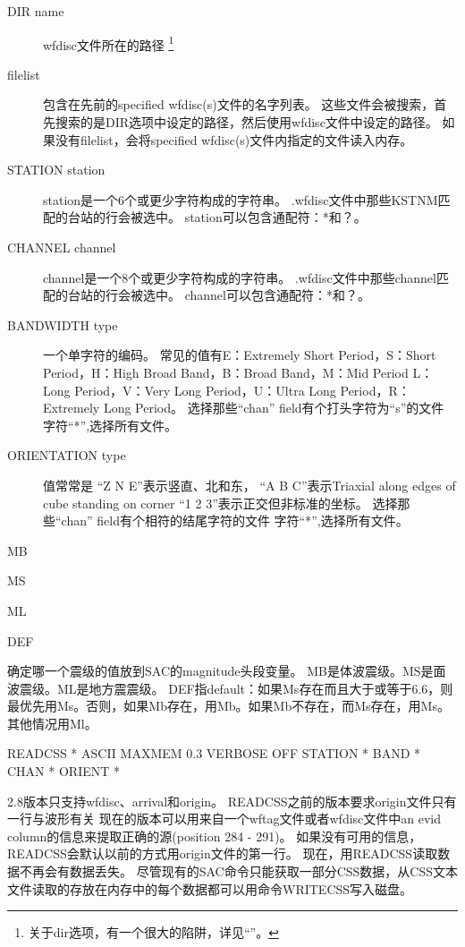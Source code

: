 \begin{description}
\item [DIR name] wfdisc文件所在的路径
    \footnote{关于dir选项，有一个很大的陷阱，详见``''。}
\item [filelist] 包含在先前的specified wfdisc(s)文件的名字列表。%
    这些文件会被搜索，首先搜索的是DIR选项中设定的路径，然后使用wfdisc文件中设定的路径。
    如果没有filelist，会将specified wfdisc(s)文件内指定的文件读入内存。
\item[STATION station]station是一个6个或更少字符构成的字符串。
    .wfdisc文件中那些KSTNM匹配的台站的行会被选中。
    station可以包含通配符：*和？。
\item[CHANNEL channel]channel是一个8个或更少字符构成的字符串。
    .wfdisc文件中那些channel匹配的台站的行会被选中。
    channel可以包含通配符：*和？。
\item [BANDWIDTH type] 一个单字符的编码。
    常见的值有E：Extremely Short Period，S：Short Period，H：High Broad Band，B：Broad Band，M：Mid Period
    L：Long Period，V：Very Long Period，U：Ultra Long Period，R：Extremely Long Period。
    选择那些``chan'' field有个打头字符为``s''的文件%
    字符``*'',选择所有文件。
\item [ORIENTATION type]值常常是
    ``Z N E''表示竖直、北和东，
    ``A B C''表示Triaxial along edges of cube standing on corner%
    ``1 2 3''表示正交但非标准的坐标。
    选择那些``chan'' field有个相符的结尾字符的文件%
    字符``*'',选择所有文件。
\end{description}
MB

MS

ML

DEF

确定哪一个震级的值放到SAC的magnitude头段变量。
MB是体波震级。MS是面波震级。ML是地方震震级。
DEF指default：如果Ms存在而且大于或等于6.6，则最优先用Ms。否则，如果Mb存在，用Mb。如果Mb不存在，而Ms存在，用Ms。其他情况用Ml。%
\begin{SACSTX}
READCSS * ASCII MAXMEM 0.3 VERBOSE OFF STATION * BAND * CHAN * ORIENT *%
\end{SACSTX}
2.8版本只支持wfdisc、arrival和origin。
READCSS之前的版本要求origin文件只有一行与波形有关%
现在的版本可以用来自一个wftag文件或者wfdisc文件中an evid column的信息来提取正确的源(position 284 - 291)。%
如果没有可用的信息，READCSS会默认以前的方式用origin文件的第一行。
现在，用READCSS读取数据不再会有数据丢失。
尽管现有的SAC命令只能获取一部分CSS数据，从CSS文本文件读取的存放在内存中的每个数据都可以用命令WRITECSS写入磁盘。

